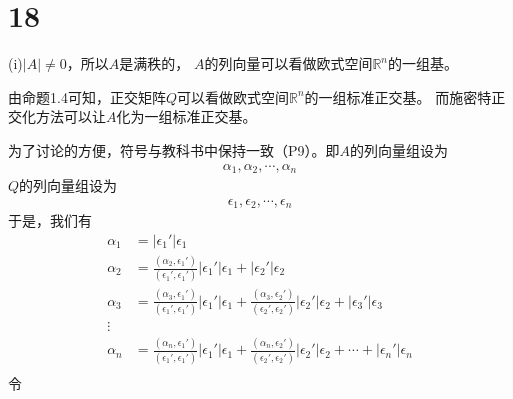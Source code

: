 \documentclass{article}
\begin{document}
\section*{18}

 (i)$|A| \neq 0$，所以$A$是满秩的，
$A$的列向量可以看做欧式空间$\mathbb{R}^n$的一组基。

由命题1.4可知，正交矩阵$Q$可以看做欧式空间$\mathbb{R}^n$的一组标准正交基。
而施密特正交化方法可以让$A$化为一组标准正交基。

为了讨论的方便，符号与教科书中保持一致（P9）。即$A$的列向量组设为
\begin{align*}
  \alpha_1, \alpha_2, \cdots, \alpha_n
\end{align*}
$Q$的列向量组设为
\begin{align*}
  \epsilon_1, \epsilon_2, \cdots, \epsilon_n
\end{align*}
于是，我们有
\begin{align*}
  \alpha_1 & = |\epsilon_1'| \epsilon_1                                                                                       \\
  \alpha_2 & = \frac{(\alpha_2, \epsilon_1')}{(\epsilon_1', \epsilon_1')} |\epsilon_1'| \epsilon_1 + |\epsilon_2'| \epsilon_2 \\
  \alpha_3 & = \frac{(\alpha_3, \epsilon_1')}{(\epsilon_1', \epsilon_1')} |\epsilon_1'| \epsilon_1 +
  \frac{(\alpha_3, \epsilon_2')}{(\epsilon_2', \epsilon_2')} |\epsilon_2'| \epsilon_2 + |\epsilon_3'| \epsilon_3              \\
  \vdots                                                                                                                      \\
  \alpha_n & = \frac{(\alpha_n, \epsilon_1')}{(\epsilon_1', \epsilon_1')} |\epsilon_1'| \epsilon_1 +
  \frac{(\alpha_n, \epsilon_2')}{(\epsilon_2', \epsilon_2')} |\epsilon_2'| \epsilon_2 + \cdots + |\epsilon_n'| \epsilon_n     \\
\end{align*}
令
\end{document}
